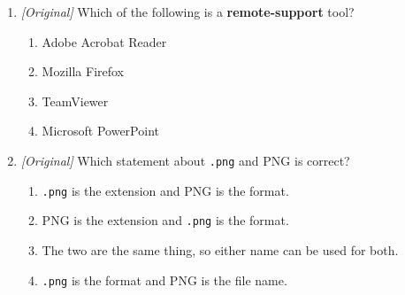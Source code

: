\documentclass[11pt]{article}
\begin{document}
\begin{enumerate}[label=\textbf{Q\arabic*.}, leftmargin=*]
\begin{enumerate}[label=(\alph*)]
  \end{enumerate}
  Which option gives all correct matches?
  \begin{enumerate}[label=\Alph*.]
    \item (i)-b, (ii)-d, (iii)-a, (iv)-c
    \item (i)-a, (ii)-b, (iii)-c, (iv)-d
    \item (i)-d, (ii)-c, (iii)-b, (iv)-a
    \item (i)-b, (ii)-c, (iii)-a, (iv)-d
  \end{enumerate}
\item \textit{[Original]} Which of the following is a
  \textbf{remote-support} tool?
  \begin{enumerate}[label=\Alph*.]
    \item Adobe Acrobat Reader
    \item Mozilla Firefox
    \item TeamViewer
    \item Microsoft PowerPoint
  \end{enumerate}
\item \textit{[Original]} Which statement about \texttt{.png} and PNG is
  correct?
  \begin{enumerate}[label=\Alph*.]
    \item \texttt{.png} is the extension and PNG is the format.
    \item PNG is the extension and \texttt{.png} is the format.
    \item The two are the same thing, so either name can be used for both.
    \item \texttt{.png} is the format and PNG is the file name.
  \end{enumerate}


\end{enumerate}
\end{document}
